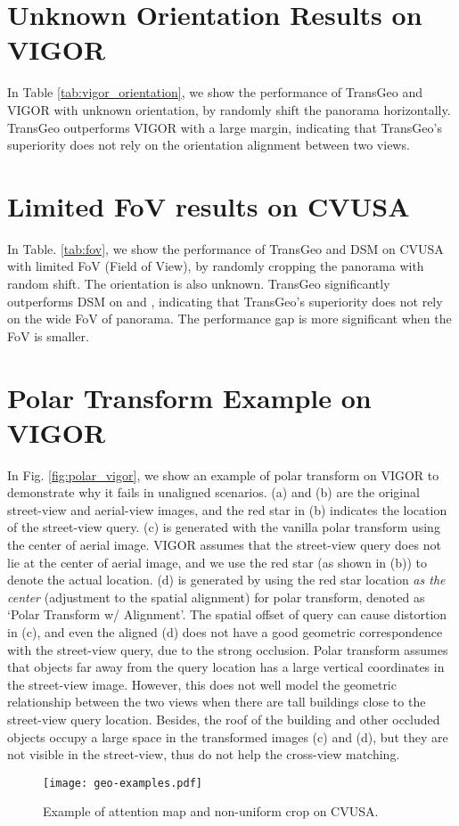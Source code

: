\documentclass[10pt,twocolumn,letterpaper]{article}
\begin{document}
\section{Unknown Orientation Results on VIGOR}
In Table \ref{tab:vigor_orientation}, we show the performance of TransGeo and VIGOR \cite{zhu2021vigor} with unknown orientation, by randomly shift the panorama horizontally. TransGeo outperforms VIGOR with a large margin, indicating that TransGeo's superiority does not rely on the orientation alignment between two views. 

\section{Limited FoV results on CVUSA}
\label{sec:fov}
In Table. \ref{tab:fov}, we show the performance of TransGeo and DSM \cite{shi2020looking} on CVUSA with limited FoV (Field of View), by randomly cropping the panorama with random shift. The orientation is also unknown.  TransGeo significantly outperforms DSM on  and , indicating that TransGeo's superiority does not rely on the wide FoV of panorama. The performance gap is more significant when the FoV is smaller. 

\section{Polar Transform Example on VIGOR}
\label{sec:polar}
In Fig. \ref{fig:polar_vigor}, we show an example of polar transform on VIGOR to demonstrate why it fails in unaligned scenarios. (a) and (b) are the original street-view and aerial-view images, and the red star in (b) indicates the location of the street-view query. (c) is generated with the vanilla polar transform using the center of aerial image. VIGOR assumes that the street-view query does not lie at the center of aerial image, and we use the red star (as shown in (b)) to denote the actual location. (d) is generated by using the red star location \textit{as the center} (\ie adjustment to the spatial alignment) for polar transform, denoted as `Polar Transform w/ Alignment'. The spatial offset of query can cause distortion in (c), and even the aligned (d) does not have a good geometric correspondence with the street-view query, due to the strong occlusion. Polar transform assumes that objects far away from the query location has a large vertical coordinates in the street-view image. However, this does not well model the geometric relationship between the two views when there are tall buildings close to the street-view query location. Besides, the roof of the building and other occluded objects occupy a large space in the transformed images (c) and (d), but they are not visible in the street-view, thus do not help the cross-view matching. 
\begin{figure}[!htbp]
    \centering
    \texttt{[image: geo-examples.pdf]}
    \caption{Example of attention map and non-uniform crop on CVUSA.}
    \label{fig:crop_cvusa}
\end{figure}
\end{document}
